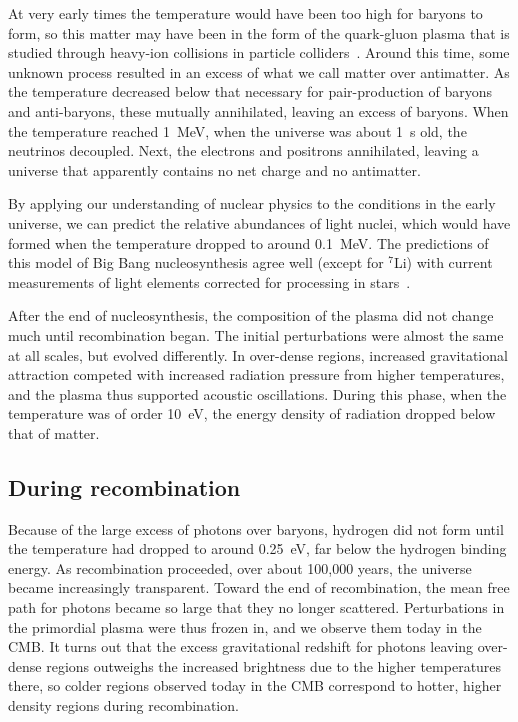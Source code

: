 At very early times the temperature would have been too high for baryons to form, so this matter may have been in the form of the quark-gluon plasma that is studied through heavy-ion collisions in particle colliders~\autocite{Shuryak2017RMP}.
Around this time, some unknown process resulted in an excess of what we call matter over antimatter.
As the temperature decreased below that necessary for pair-production of baryons and anti-baryons, these mutually annihilated, leaving an excess of baryons.
When the temperature reached \SI{1}{MeV}, when the universe was about \SI{1}{s} old, the neutrinos decoupled.
Next, the electrons and positrons annihilated, leaving a universe that apparently contains no net charge and no antimatter.

By applying our understanding of nuclear physics to the conditions in the early universe, we can predict the relative abundances of  light nuclei, which would have formed when the temperature dropped to around \SI{0.1}{MeV}.
The predictions of this model of Big Bang nucleosynthesis agree well (except for $^7$Li) with current measurements of light elements corrected for processing in stars~\autocite{Cyburt2016RMP}.

After the end of nucleosynthesis, the composition of the plasma did not change much until recombination began.
The initial perturbations were almost the same at all scales, but evolved differently.
In over-dense regions, increased gravitational attraction competed with increased radiation pressure from higher temperatures, and the plasma thus supported acoustic oscillations.
During this phase, when the temperature was of order \SI{10}{eV}, the energy density of radiation dropped below that of matter.


\subsection{During recombination}
\label{sec:cmb.physics.during}

Because of the large excess of photons over baryons, hydrogen did not form until the temperature had dropped to around \SI{0.25}{eV}, far below the hydrogen binding energy.
As recombination proceeded, over about 100,000 years, the universe became increasingly transparent.
Toward the end of recombination, the mean free path for photons became so large that they no longer scattered.
Perturbations in the primordial plasma were thus frozen in, and we observe them today in the CMB.
It turns out that the excess gravitational redshift for photons leaving over-dense regions outweighs the increased brightness due to the higher temperatures there, so colder regions observed today in the CMB correspond to hotter, higher density regions during recombination.

